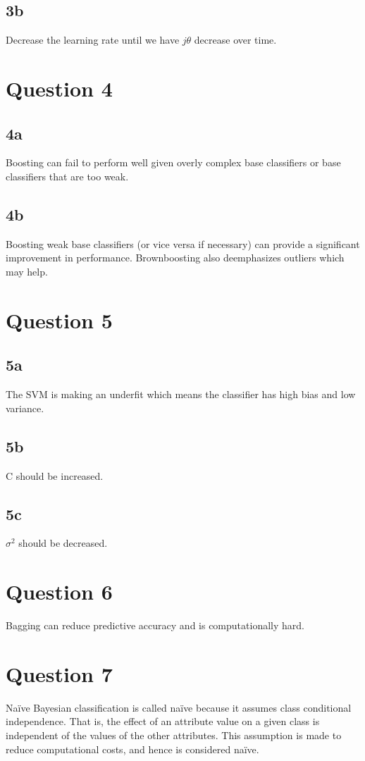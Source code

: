\documentclass{article}
\begin{document}
\subsection{3b}
Decrease the learning rate until we have $j\theta$ decrease over time.

\section{Question 4}

\subsection{4a}
Boosting can fail to perform well given overly complex base classifiers or base classifiers that are too weak.

\subsection{4b}
Boosting weak base classifiers (or vice versa if necessary) can provide a significant improvement in performance. Brownboosting also deemphasizes outliers which may help.

\section{Question 5}

\subsection{5a}
The SVM is making an underfit which means the classifier has high bias and low variance. 

\subsection{5b}
C should be increased.

\subsection{5c}
$\sigma^2$ should be decreased.

\section{Question 6}

Bagging can reduce predictive accuracy and is computationally hard.

\section{Question 7}
Na{\"i}ve Bayesian classification is called na{\"i}ve because it assumes class conditional independence. That is, the effect of an attribute value on a given class is independent of
the values of the other attributes. This assumption is made to reduce computational costs, and hence is considered na{\"i}ve.
\end{document}

